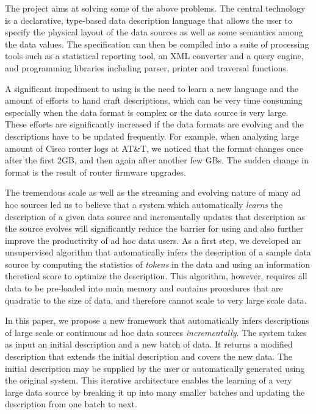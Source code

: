 The \pads{} project \cite{padsweb} aims at solving some of the above 
problems. The central technology is a declarative, type-based 
data description language that allows the user to specify the physical
layout of the data sources as well as some semantics among the data
values. The specification can then be compiled into a suite of
processing tools such as a statistical reporting tool, an 
XML converter and a query engine, and programming libraries 
including parser, printer and traversal functions. 

A significant impediment to using \pads{} is the need to learn
a new language and the amount of efforts to
hand craft \pads{} descriptions, which can be very time consuming
especially when the data format is complex or the data source is
very large. These efforts are significantly increased if the data
formats are evolving and the descriptions have to be updated 
frequently. For example, when analyzing large amount of Cisco router
logs at AT\&T, we noticed that the format changes once after the first 2GB, 
and then again after another few GBs. The sudden change in format is
the result of router firmware upgrades.

The tremendous scale as well as the streaming and evolving nature of many ad hoc
sources led us to believe that a system which automatically {\em learns}
the \pads{} description of a given data source and incrementally updates that
description as the source evolves will significantly reduce the barrier for
using \pads{} and also further improve the productivity of ad hoc data users.
As a first step, we developed an unsupervised algorithm \learnpads{}
\cite{Fisher+:dirttoshovels,fisher+:sigmod08}
that automatically infers the \pads{} description of a sample data source by 
computing the statistics of {\em tokens} in the data and using an information
theretical score to optimize the description. This algorithm, however,
requires all data to be pre-loaded into main memory and contains procedures 
that are quadratic to the size of data, 
and therefore cannot scale to very large scale data. 

In this paper, we propose a new framework that automatically infers 
descriptions of large scale or continuous ad hoc data sources 
{\em incrementally}. The system takes as input an initial description 
and a new batch of data. It returns a
modified description that extends the initial description and covers the new 
data. The initial description may be supplied by the user or automatically
generated using the original \learnpads{} system. This iterative architecture
enables the learning of a very large data source by breaking it up 
into many smaller batches and updating the description from one batch to next. 
